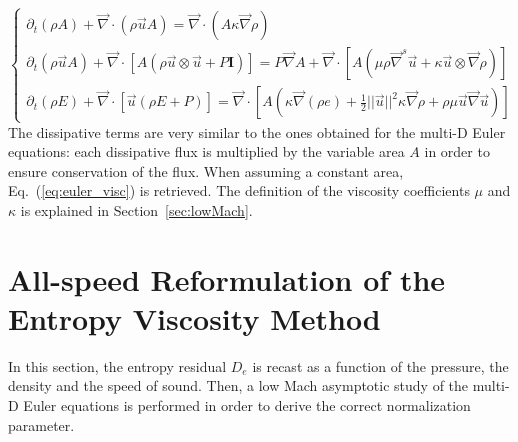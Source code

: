 \documentclass[preprint,10pt]{elsarticle}
\renewcommand{\div}{\vec{\nabla}\! \cdot \!}
\newcommand{\grad}{\vec{\nabla}}
\newcommand{\eqt}[1]{Eq.~(\ref{#1})}                     %
\newcommand{\sct}[1]{Section~\ref{#1}}                   %
\begin{document}
\begin{equation}
\label{eq:euler_variable_A_bis}
\left\{ 
\begin{array}{lll}
\partial_t \left( \rho A \right) + \div \left( \rho \vec{u} A \right) = \div \left( A \kappa \grad \rho \right) \\
\partial_t \left( \rho \vec{u} A \right) + \div \left[A\left( \rho \vec{u} \otimes \vec{u} + P \mathbf{I} \right) \right] = P \grad A + \div \left[ A \left( \mu \rho \grad^s \vec{u}  + \kappa \vec{u} \otimes \grad \rho \right) \right]\\
\partial_t \left( \rho E \right) + \div \left[ \vec{u} \left( \rho E + P \right) \right] = \div \left[ A \left( \kappa \grad \left( \rho e \right) + \frac{1}{2}|| \vec{u} ||^2 \kappa \grad \rho +  \rho \mu \vec{u} \grad \vec{u}  \right) \right]
\end{array}
\right.
\end{equation}
The dissipative terms are very similar to the ones obtained for the multi-D Euler equations: each dissipative flux is multiplied by the variable area $A$ in order to  ensure conservation of the flux. When assuming a constant area, \eqt{eq:euler_visc} is retrieved. The definition of the viscosity coefficients $\mu$ and $\kappa$ is explained in \sct{sec:lowMach}.
\section{All-speed Reformulation of the Entropy Viscosity Method} \label{sec:extension}
In this section, the entropy residual $D_e$ is recast as a function of the pressure, the density and the speed of sound. Then, a low Mach asymptotic study of the multi-D Euler equations is performed in order to derive the correct normalization parameter. 
\end{document}
